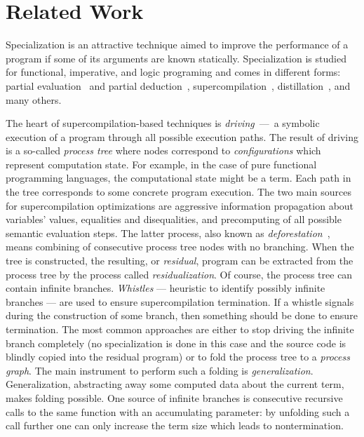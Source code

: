 \section{Related Work}

Specialization is an attractive technique aimed to improve the performance of a program if some of its arguments are known statically.
Specialization is studied for functional, imperative, and logic programing and comes in different forms: partial evaluation~\cite{jonesbook} and partial deduction~\cite{lloyd1991partial}, supercompilation~\cite{soerensen1996positive}, distillation~\cite{hamilton2007distillation}, and many others.


The heart of supercompilation-based techniques is \emph{driving}~---~a symbolic execution of a program through all possible execution paths.
The result of driving is a so-called \emph{process tree} where nodes correspond to \emph{configurations} which represent computation state.
For example, in the case of pure functional programming languages, the computational state might be a term.
Each path in the tree corresponds to some concrete program execution.
The two main sources for supercompilation optimizations are aggressive information propagation about variables' values, equalities and disequalities, and precomputing of all possible semantic evaluation steps.
The latter process, also known as \emph{deforestation}~\cite{deforestation}, means  combining of consecutive process tree nodes with no branching.
When the tree is constructed, the resulting, or \emph{residual}, program can be extracted from the process tree by the process called \emph{residualization}.
Of course, the process tree can contain infinite branches.
\emph{Whistles} --- heuristic to identify possibly infinite branches --- are used to ensure supercompilation termination.
If a whistle signals during the construction of some branch, then something should be done to ensure termination.
The most common approaches are either to stop driving the infinite branch completely (no specialization is done in this case and the source code is blindly copied into the residual program) or to fold the process tree to a \emph{process graph}.
The main instrument to perform such a folding is \emph{generalization}.
Generalization, abstracting away some computed data about the current term, makes folding possible.
One source of infinite branches is consecutive recursive calls to the same function with an accumulating parameter: by unfolding such a call further one can only increase the term size which leads to nontermination.
